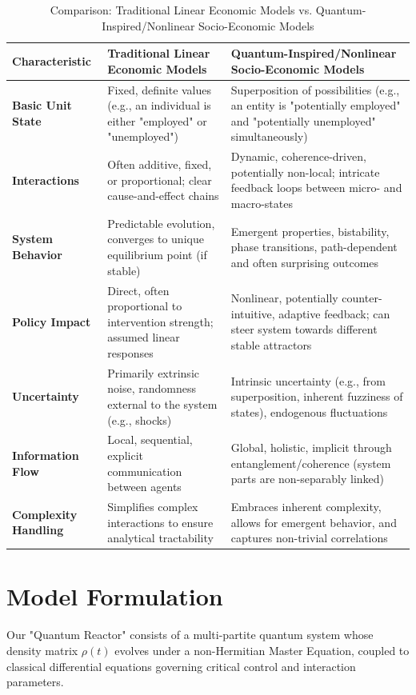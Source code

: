 \documentclass[9pt]{article}
\begin{document}
\begin{table}[htbp]
    \centering
    \caption{Comparison: Traditional Linear Economic Models vs. Quantum-Inspired/Nonlinear Socio-Economic Models}
    \label{tab:qm_vs_linear_economy}
    \begin{tabularx}{\textwidth}{p{} | X | X}
        \toprule
        \textbf{Characteristic} & \textbf{Traditional Linear Economic Models} & \textbf{Quantum-Inspired/Nonlinear Socio-Economic Models} \\
        \midrule
        \textbf{Basic Unit State} & Fixed, definite values (e.g., an individual is either "employed" or "unemployed") & Superposition of possibilities (e.g., an entity is "potentially employed" and "potentially unemployed" simultaneously) \\
        \textbf{Interactions} & Often additive, fixed, or proportional; clear cause-and-effect chains & Dynamic, coherence-driven, potentially non-local; intricate feedback loops between micro- and macro-states \\
        \textbf{System Behavior} & Predictable evolution, converges to unique equilibrium point (if stable) & Emergent properties, bistability, phase transitions, path-dependent and often surprising outcomes \\
        \textbf{Policy Impact} & Direct, often proportional to intervention strength; assumed linear responses & Nonlinear, potentially counter-intuitive, adaptive feedback; can steer system towards different stable attractors \\
        \textbf{Uncertainty} & Primarily extrinsic noise, randomness external to the system (e.g., shocks) & Intrinsic uncertainty (e.g., from superposition, inherent fuzziness of states), endogenous fluctuations \\
        \textbf{Information Flow} & Local, sequential, explicit communication between agents & Global, holistic, implicit through entanglement/coherence (system parts are non-separably linked) \\
        \textbf{Complexity Handling} & Simplifies complex interactions to ensure analytical tractability & Embraces inherent complexity, allows for emergent behavior, and captures non-trivial correlations \\
        \bottomrule
    \end{tabularx}
\end{table}


\section{Model Formulation}
Our "Quantum Reactor" consists of a multi-partite quantum system whose density matrix $\rho(t)$ evolves under a non-Hermitian Master Equation, coupled to classical differential equations governing critical control and interaction parameters.
\end{document}
